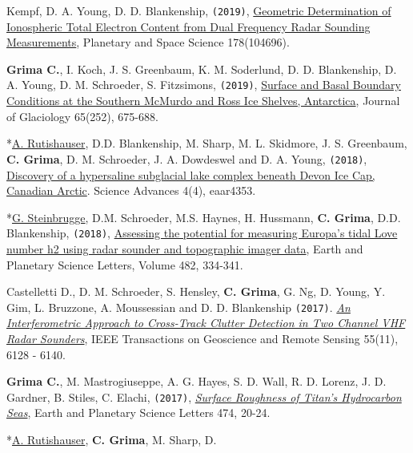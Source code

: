 \begin{etaremune}
  Kempf, D. A. Young, D. D. Blankenship, \texttt{(2019)},
  \href{https://www.sciencedirect.com/science/article/pii/S0032063319300820}{Geometric
  Determination of Ionospheric Total Electron Content from Dual
  Frequency Radar Sounding Measurements}, Planetary and Space Science 178(104696).
\item
  \textbf{Grima C.}, I. Koch, J. S. Greenbaum, K. M. Soderlund, D. D.
  Blankenship, D. A. Young, D. M. Schroeder, S. Fitzsimons,
  \texttt{(2019)},
  \href{https://www.cambridge.org/core/journals/journal-of-glaciology/article/surface-and-basal-boundary-conditions-at-the-southern-mcmurdo-and-ross-ice-shelves-antarctica/3ED3BFD465A3F6A5FC48342694F91EC5}{Surface
  and Basal Boundary Conditions at the Southern McMurdo and Ross Ice
  Shelves, Antarctica}, Journal of Glaciology 65(252), 675-688.
\item
  *\underline{A. Rutishauser}, D.D. Blankenship, M. Sharp, M. L.
  Skidmore, J. S. Greenbaum, \textbf{C. Grima}, D. M. Schroeder, J. A.
  Dowdeswel and D. A. Young, \texttt{(2018)},
  \href{http://advances.sciencemag.org/content/4/4/eaar4353}{Discovery
  of a hypersaline subglacial lake complex beneath Devon Ice Cap,
  Canadian Arctic}. Science Advances 4(4), eaar4353.
\item
  *\underline{G. Steinbrugge}, D.M. Schroeder, M.S. Haynes, H. Hussmann,
  \textbf{C. Grima}, D.D. Blankenship, \texttt{(2018)},
  \href{https://www.sciencedirect.com/science/article/pii/S0012821X17306647}{Assessing
  the potential for measuring Europa's tidal Love number h2 using radar
  sounder and topographic imager data}, Earth and Planetary Science
  Letters, Volume 482, 334-341.
\item
  Castelletti D., D. M. Schroeder, S. Hensley, \textbf{C. Grima}, G. Ng,
  D. Young, Y. Gim, L. Bruzzone, A. Moussessian and D. D. Blankenship
  \texttt{(2017)}.
  \href{http://ieeexplore.ieee.org/abstract/document/8012547/}{\emph{An
  Interferometric Approach to Cross-Track Clutter Detection in Two
  Channel VHF Radar Sounders}}, IEEE Transactions on Geoscience and
  Remote Sensing 55(11), 6128 - 6140.
\item
  \textbf{Grima C.}, M. Mastrogiuseppe, A. G. Hayes, S. D. Wall, R. D.
  Lorenz, J. D. Gardner, B. Stiles, C. Elachi, \texttt{(2017)},
  \href{http://www.sciencedirect.com/science/article/pii/S0012821X17303163}{\emph{Surface
  Roughness of Titan's Hydrocarbon Seas}}, Earth and Planetary Science
  Letters 474, 20-24.
\item
  *\underline{A. Rutishauser}, \textbf{C. Grima}, M. Sharp, D.

\end{etaremune}
